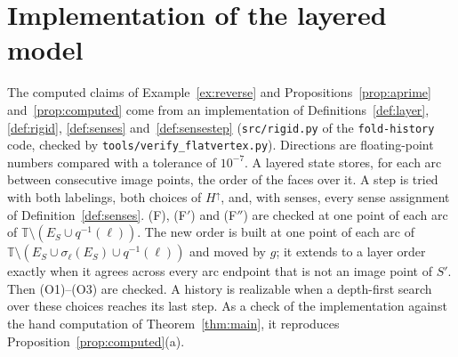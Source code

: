 \documentclass[11pt]{amsart}
\theoremstyle{definition}
\theoremstyle{remark}
\newcommand{\T}{\mathbb{T}}
\newcommand{\up}{H^{\uparrow}}
\begin{document}
\section{Implementation of the layered model}\label{app:impl}
The computed claims of Example~\ref{ex:reverse} and Propositions~\ref{prop:aprime}
and~\ref{prop:computed} come from an implementation of Definitions~\ref{def:layer},
\ref{def:rigid}, \ref{def:senses} and~\ref{def:sensestep} (\texttt{src/rigid.py} of the
\texttt{fold-history} code, checked by \texttt{tools/verify\_flatvertex.py}). Directions are
floating-point numbers compared with a tolerance of $10^{-7}$. A layered state stores, for each arc
between consecutive image points, the order of the faces over it. A step is tried with both
labelings, both choices of $\up$, and, with senses, every sense assignment of
Definition~\ref{def:senses}. (F), (F$'$) and (F$''$) are checked at one point of each arc of
$\T\setminus(E_S\cup q^{-1}(\ell))$. The new order is built at one point of each arc of
$\T\setminus(E_S\cup\sigma_\ell(E_S)\cup q^{-1}(\ell))$ and moved by $g$; it extends to a layer
order exactly when it agrees across every arc endpoint that is not an image point of $S'$. Then
(O1)--(O3) are checked. A history is realizable when a depth-first search over these choices
reaches its last step. As a check of the implementation against the hand computation of
Theorem~\ref{thm:main}, it reproduces Proposition~\ref{prop:computed}(a).
\end{document}

